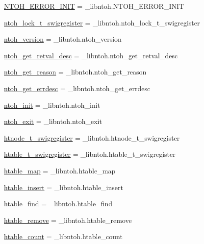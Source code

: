 \begin{DoxyCompactItemize}
\item 
\hyperlink{namespacelibntoh_a35d1d3868f9cd495da468d277967807c}{N\-T\-O\-H\-\_\-\-E\-R\-R\-O\-R\-\_\-\-I\-N\-I\-T} = \-\_\-libntoh.\-N\-T\-O\-H\-\_\-\-E\-R\-R\-O\-R\-\_\-\-I\-N\-I\-T
\item 
\hyperlink{namespacelibntoh_a98a29460ccb332056e3ffb8ffb551e9f}{ntoh\-\_\-lock\-\_\-t\-\_\-swigregister} = \-\_\-libntoh.\-ntoh\-\_\-lock\-\_\-t\-\_\-swigregister
\item 
\hyperlink{namespacelibntoh_a376ec2b131be709883e227a7f7ab68b9}{ntoh\-\_\-version} = \-\_\-libntoh.\-ntoh\-\_\-version
\item 
\hyperlink{namespacelibntoh_a7329cced91f50574307075bdfb61735b}{ntoh\-\_\-get\-\_\-retval\-\_\-desc} = \-\_\-libntoh.\-ntoh\-\_\-get\-\_\-retval\-\_\-desc
\item 
\hyperlink{namespacelibntoh_a971f1fc699a26a9f2b5f461a598f35bd}{ntoh\-\_\-get\-\_\-reason} = \-\_\-libntoh.\-ntoh\-\_\-get\-\_\-reason
\item 
\hyperlink{namespacelibntoh_afc942c21c72dbde6e93b31b7d65e4cd0}{ntoh\-\_\-get\-\_\-errdesc} = \-\_\-libntoh.\-ntoh\-\_\-get\-\_\-errdesc
\item 
\hyperlink{namespacelibntoh_a34b8571e53d6d15d244b3053313a6c43}{ntoh\-\_\-init} = \-\_\-libntoh.\-ntoh\-\_\-init
\item 
\hyperlink{namespacelibntoh_a50419ae251d877a1ff9d45d460a306cb}{ntoh\-\_\-exit} = \-\_\-libntoh.\-ntoh\-\_\-exit
\item 
\hyperlink{namespacelibntoh_a94bf4991e947defd93cffe2e06e8167e}{htnode\-\_\-t\-\_\-swigregister} = \-\_\-libntoh.\-htnode\-\_\-t\-\_\-swigregister
\item 
\hyperlink{namespacelibntoh_aa5eb029a7e6bab4f20d15c66d6bc9d83}{htable\-\_\-t\-\_\-swigregister} = \-\_\-libntoh.\-htable\-\_\-t\-\_\-swigregister
\item 
\hyperlink{namespacelibntoh_a8c0ae239e5826ee96ff72977172a3193}{htable\-\_\-map} = \-\_\-libntoh.\-htable\-\_\-map
\item 
\hyperlink{namespacelibntoh_a651be314ba5b558995a5586502fc61e2}{htable\-\_\-insert} = \-\_\-libntoh.\-htable\-\_\-insert
\item 
\hyperlink{namespacelibntoh_aeb2568939bb33a7979e22a345e065919}{htable\-\_\-find} = \-\_\-libntoh.\-htable\-\_\-find
\item 
\hyperlink{namespacelibntoh_a147903b845bcb7a8a2cef39995cd7771}{htable\-\_\-remove} = \-\_\-libntoh.\-htable\-\_\-remove
\item 
\hyperlink{namespacelibntoh_a3352e70f5234a1568c4d67064dcbecf0}{htable\-\_\-count} = \-\_\-libntoh.\-htable\-\_\-count

\end{DoxyCompactItemize}
